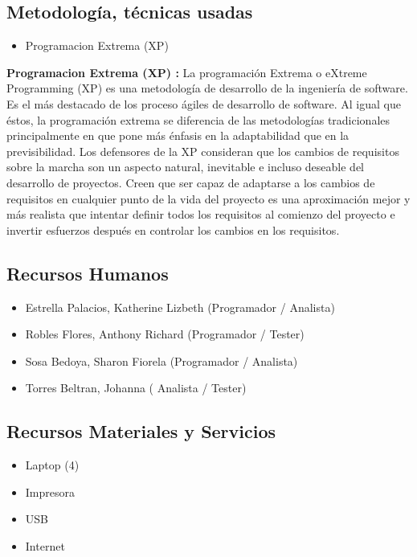 \documentclass[preprint,12pt]{elsarticle}
\begin{document}
	\subsection{Metodología, técnicas usadas }	
	
	\begin{itemize}
    \item Programacion Extrema (XP) 

	\end{itemize}
	
	\textbf{Programacion Extrema (XP) :} La programación Extrema o eXtreme Programming (XP) es una metodología de desarrollo de la ingeniería de software. Es el más destacado de los proceso ágiles de desarrollo de software. Al igual que éstos, la programación extrema se diferencia de las metodologías tradicionales principalmente en que pone más énfasis en la adaptabilidad que en la previsibilidad. Los defensores de la XP consideran que los cambios de requisitos sobre la marcha son un aspecto natural, inevitable e incluso deseable del desarrollo de proyectos. Creen que ser capaz de adaptarse a los cambios de requisitos en cualquier punto de la vida del proyecto es una aproximación mejor y más realista que intentar definir todos los requisitos al comienzo del proyecto e invertir esfuerzos después en controlar los cambios en los requisitos.
		

\subsection{\textbf{Recursos Humanos}}
\begin{itemize}
	\item Estrella Palacios, Katherine Lizbeth (Programador / Analista)
	\item Robles Flores, Anthony Richard (Programador / Tester)
	\item Sosa Bedoya, Sharon Fiorela (Programador / Analista)
	\item Torres Beltran, Johanna ( Analista / Tester)
\end{itemize}

\subsection{\textbf{Recursos Materiales y Servicios}}
\begin{itemize}
	\item Laptop (4)
	\item Impresora
	\item USB
	\item Internet
\end{itemize}
	
\end{document}
